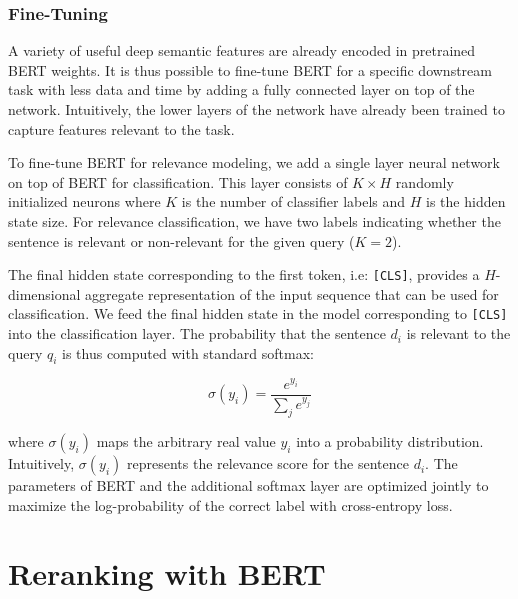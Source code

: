 
\subsubsection{Fine-Tuning}

A variety of useful deep semantic features are already encoded in pretrained BERT weights.
It is thus possible to fine-tune BERT for a specific downstream task with less data and time by adding a fully connected layer on top of the network.
Intuitively, the lower layers of the network have already been trained to capture features relevant to the task.

To fine-tune BERT for relevance modeling, we add a single layer neural network on top of BERT for classification.
This layer consists of $ K \times H $ randomly initialized neurons where $ K $ is the number of classifier labels and $ H$ is the hidden state size.
For relevance classification, we have two labels indicating whether the sentence is relevant or non-relevant for the given query ($ K = 2 $).

The final hidden state corresponding to the first token, i.e: \texttt{[CLS]}, provides a $ H $-dimensional aggregate representation of the input sequence that can be used for classification.
We feed the final hidden state in the model corresponding to \texttt{[CLS]} into the classification layer.
The probability that the sentence $ d_i $ is relevant to the query $ q_i $ is thus computed with standard softmax:
 
\begin{equation}
\sigma (y_i) = \frac{e^{y_i}}{\sum_j e^{y_j}}
\end{equation}

where $\sigma (y_i)$ maps the arbitrary real value $ y_i $ into a probability distribution.
Intuitively, $\sigma (y_i)$ represents the relevance score for the sentence $ d_i $.
The parameters of BERT and the additional softmax layer are optimized jointly to maximize the log-probability of the correct label with cross-entropy loss.

\section{Reranking with BERT}


